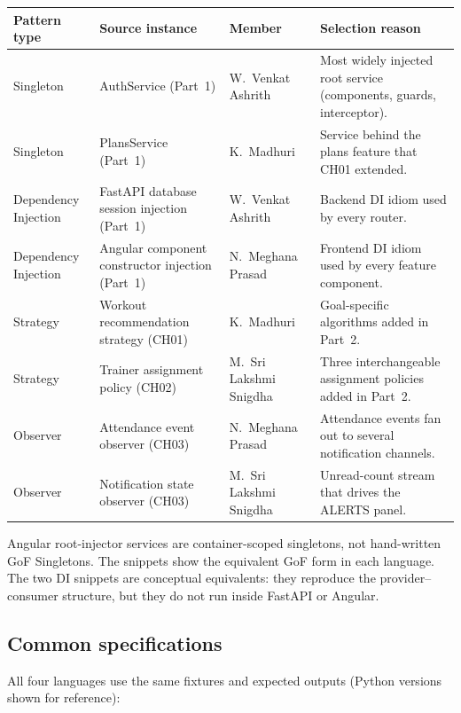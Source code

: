 \documentclass[11pt,a4paper]{article}
\begin{document}
\begin{tabularx}{\linewidth}{@{}p{2.4cm}p{3.6cm}p{2.2cm}L@{}}
\toprule
Pattern type & Source instance & Member & Selection reason\\
\midrule
Singleton & AuthService (Part~1) & W.~Venkat Ashrith & Most widely injected root service (components, guards, interceptor).\\
Singleton & PlansService (Part~1) & K.~Madhuri & Service behind the plans feature that CH01 extended.\\
Dependency Injection & FastAPI database session injection (Part~1) & W.~Venkat Ashrith & Backend DI idiom used by every router.\\
Dependency Injection & Angular component constructor injection (Part~1) & N.~Meghana Prasad & Frontend DI idiom used by every feature component.\\
Strategy & Workout recommendation strategy (CH01) & K.~Madhuri & Goal-specific algorithms added in Part~2.\\
Strategy & Trainer assignment policy (CH02) & M.~Sri Lakshmi Snigdha & Three interchangeable assignment policies added in Part~2.\\
Observer & Attendance event observer (CH03) & N.~Meghana Prasad & Attendance events fan out to several notification channels.\\
Observer & Notification state observer (CH03) & M.~Sri Lakshmi Snigdha & Unread-count stream that drives the ALERTS panel.\\
\bottomrule
\end{tabularx}

Angular root-injector services are container-scoped singletons, not hand-written GoF Singletons. The snippets show the equivalent GoF form in each language. The two DI snippets are conceptual equivalents: they reproduce the provider--consumer structure, but they do not run inside FastAPI or Angular.

\subsection{Common specifications}

All four languages use the same fixtures and expected outputs (Python versions shown for reference):
\end{document}
